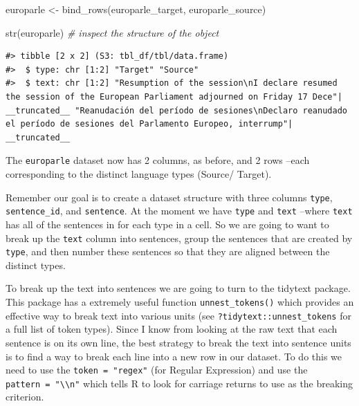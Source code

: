 \documentclass[
  letterpaper,
]{scrbook}
\newenvironment{Shaded}{\begin{snugshade}}{\end{snugshade}}
\newcommand{\CommentTok}[1]{\textcolor[rgb]{0.00,0.00,0.00}{\textit{#1}}}
\newcommand{\FunctionTok}[1]{\textcolor[rgb]{0.00,0.00,0.00}{#1}}
\newcommand{\NormalTok}[1]{\textcolor[rgb]{0.00,0.00,0.00}{#1}}
\newcommand{\OtherTok}[1]{\textcolor[rgb]{0.00,0.00,0.00}{#1}}
\begin{document}
\begin{Shaded}
\begin{Highlighting}[]
\NormalTok{europarle }\OtherTok{\textless{}{-}} 
  \FunctionTok{bind\_rows}\NormalTok{(europarle\_target, europarle\_source)}

\FunctionTok{str}\NormalTok{(europarle) }\CommentTok{\# inspect the structure of the object}
\end{Highlighting}
\end{Shaded}

\begin{verbatim}
#> tibble [2 x 2] (S3: tbl_df/tbl/data.frame)
#>  $ type: chr [1:2] "Target" "Source"
#>  $ text: chr [1:2] "Resumption of the session\nI declare resumed the session of the European Parliament adjourned on Friday 17 Dece"| __truncated__ "Reanudación del período de sesiones\nDeclaro reanudado el período de sesiones del Parlamento Europeo, interrump"| __truncated__
\end{verbatim}

The \texttt{europarle} dataset now has 2 columns, as before, and 2 rows
--each corresponding to the distinct language types (Source/ Target).

Remember our goal is to create a dataset structure with three columns
\texttt{type}, \texttt{sentence\_id}, and \texttt{sentence}. At the
moment we have \texttt{type} and \texttt{text} --where \texttt{text} has
all of the sentences in for each type in a cell. So we are going to want
to break up the \texttt{text} column into sentences, group the sentences
that are created by \texttt{type}, and then number these sentences so
that they are aligned between the distinct types.

To break up the text into sentences we are going to turn to the tidytext
package. This package has a extremely useful function
\texttt{unnest\_tokens()} which provides an effective way to break text
into various units (see \texttt{?tidytext::unnest\_tokens} for a full
list of token types). Since I know from looking at the raw text that
each sentence is on its own line, the best strategy to break the text
into sentence units is to find a way to break each line into a new row
in our dataset. To do this we need to use the \texttt{token\ =\ "regex"}
(for Regular Expression) and use the
\texttt{pattern\ =\ "\textbackslash{}\textbackslash{}n"} which tells R
to look for carriage returns to use as the breaking criterion.
\end{document}
